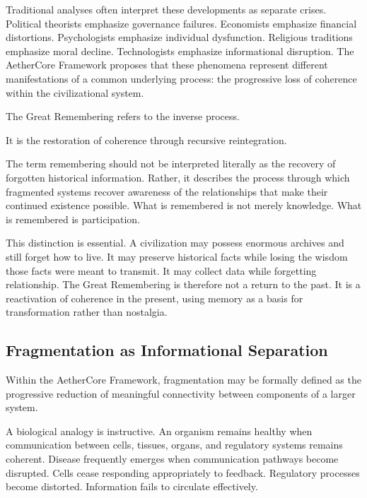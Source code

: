 \documentclass[12pt]{article}
\begin{document}
Traditional analyses often interpret these developments as separate crises. Political theorists emphasize governance failures. Economists emphasize financial distortions. Psychologists emphasize individual dysfunction. Religious traditions emphasize moral decline. Technologists emphasize informational disruption. The AetherCore Framework proposes that these phenomena represent different manifestations of a common underlying process: the progressive loss of coherence within the civilizational system.

The Great Remembering refers to the inverse process.

It is the restoration of coherence through recursive reintegration.

The term remembering should not be interpreted literally as the recovery of forgotten historical information. Rather, it describes the process through which fragmented systems recover awareness of the relationships that make their continued existence possible. What is remembered is not merely knowledge. What is remembered is participation.

This distinction is essential. A civilization may possess enormous archives and still forget how to live. It may preserve historical facts while losing the wisdom those facts were meant to transmit. It may collect data while forgetting relationship. The Great Remembering is therefore not a return to the past. It is a reactivation of coherence in the present, using memory as a basis for transformation rather than nostalgia.


\subsection{Fragmentation as Informational Separation}

Within the AetherCore Framework, fragmentation may be formally defined as the progressive reduction of meaningful connectivity between components of a larger system.

A biological analogy is instructive. An organism remains healthy when communication between cells, tissues, organs, and regulatory systems remains coherent. Disease frequently emerges when communication pathways become disrupted. Cells cease responding appropriately to feedback. Regulatory processes become distorted. Information fails to circulate effectively.
\end{document}
